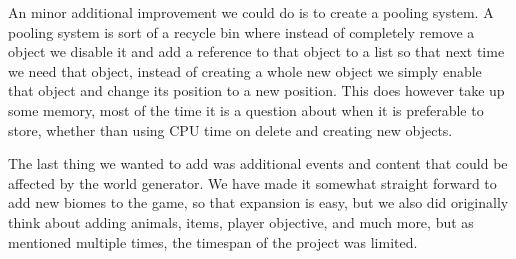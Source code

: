An minor additional improvement we could do is to create a pooling system. A pooling system is sort of a recycle bin where instead of completely remove a object we disable it and add a reference to that object to a list so that next time we need that object, instead of creating a whole new object we simply enable that object and change its position to a new position. This does however take up some memory, most of the time it is a question about when it is preferable to store, whether than using CPU time on delete and creating new objects.

The last thing we wanted to add was additional events and content that could be affected by the world generator. We have made it somewhat straight forward to add new biomes to the game, so that expansion is easy, but we also did originally think about adding animals, items, player objective, and much more, but as mentioned multiple times, the timespan of the project was limited.